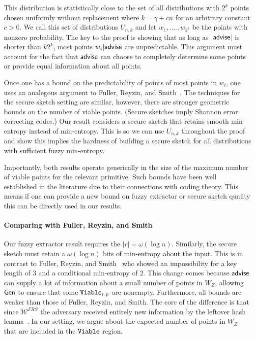 This distribution is statistically close to the set of all distributions with $2^k$ points chosen uniformly without replacement where $k = \gamma +cn$ for an arbitrary constant $c>0$.  We call this set of distributions $U_{n,k}$ and let $w_1,...., w_{2^k}$ be the points with nonzero probability.  The key to the proof is showing that as long as $|{\mathsf{advise}}|$ is shorter than $k2^k$, most points $w_i | {\mathsf{advise}}$ are unpredictable.  This argument must account for the fact that ${\mathsf{advise}}$ can choose to completely determine some points or provide equal information about all points. 

Once one has a bound on the predictability of points of most points in $w_i$, one uses an analegous argument to Fuller, Reyzin, and Smith~\cite{fuller2020fuzzy}. The techniques for the secure sketch setting are similar, however, there are stronger geometric bounds on the number of viable points. (Secure sketches imply Shannon error correcting codes.)  Our result considers a secure sketch that retains smooth min-entropy instead of min-entropy.  This is so we can use $U_{n,k}$ throughout the proof and show this implies the hardness of building a secure sketch for all distributions with sufficient fuzzy min-entropy.  

Importantly, both results operate generically in the size of the maximum number of viable points for the relevant primitive.  Such bounds have been well established in the literature due to their connections with coding theory.  This means if one can provide a new bound on fuzzy extractor or secure sketch quality this can be directly used in our results.


\paragraph{Comparing with Fuller, Reyzin, and Smith~\cite{fuller2020computational}}
Our fuzzy extractor result requires the $|r| = \omega(\log n)$.  Similarly, the secure sketch must retain a $\omega(\log n)$ bits of min-entropy about the input. This is in contrast to Fuller, Reyzin, and Smith~\cite{fuller2020computational} who showed an impossibility for a key length of $3$ and a conditional min-entropy of $2$.  This change comes because ${\mathsf{advise}}$ can supply a lot of information about a small number of points in $W_Z$, allowing ${\mathsf{Gen}}$ to ensure that some $\mathtt{Viable}_{r,p}$ are nonempty. Furthermore, all bounds are weaker than those of Fuller, Reyzin, and Smith.  The core of the difference is that since $\mathcal{W}^{FRS}$ the adversary received entirely new information by the leftover hash lemma~\cite{haastad1993construction,barak2011leftover}. In our setting, we argue about the expected number of points in $W_Z$ that are included in the $\mathtt{Viable}$ region. 

